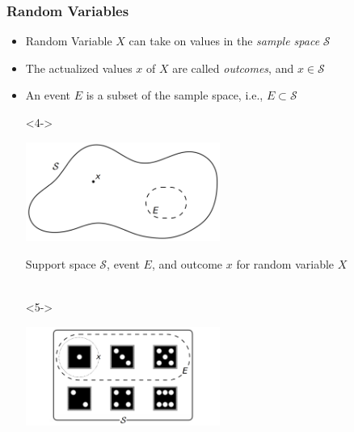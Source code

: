 \documentclass[xcolor={dvipsnames}]{beamer}
\begin{document}
\frame
{
 \frametitle{Random Variables}

\begin{itemize}
\item Random Variable $X$ can take on values in the \emph{sample space} $\mathcal{S}$
\item<2-> The actualized values $x$ of $X$ are called \emph{outcomes}, and $x \in \mathcal{S}$ 
\item<3-> An event $E$ is a subset of the sample space, i.e., $E \subset \mathcal{S}$
\item[]
\item[]<4-> 

\hspace{3.5em} \includegraphics[width=2.5in]{stuff/ss.png}  

\tiny
\hspace{7em}Support space $\mathcal{S}$, event $E$, and outcome $x$ for random variable $X$\\${}$


\item[]<5-> 

\vspace{-10.3em}
\hspace{3.5em} \includegraphics[width=2.5in]{stuff/dice4.png}  

\vspace{2em}

\end{itemize}
}
\end{document}
